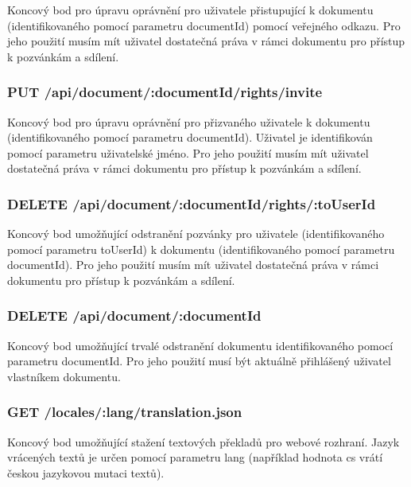 Koncový bod pro úpravu oprávnění pro uživatele přistupující k dokumentu (identifikovaného pomocí parametru documentId) pomocí veřejného odkazu.
Pro jeho použití musím mít uživatel dostatečná práva v rámci dokumentu pro přístup k pozvánkám a sdílení.

\subsubsection{PUT /api/document/:documentId/rights/invite}

Koncový bod pro úpravu oprávnění pro přizvaného uživatele k dokumentu (identifikovaného pomocí parametru documentId).
Uživatel je identifikován pomocí parametru uživatelské jméno.
Pro jeho použití musím mít uživatel dostatečná práva v rámci dokumentu pro přístup k pozvánkám a sdílení.

\subsubsection{DELETE /api/document/:documentId/rights/:toUserId}

Koncový bod umožňující odstranění pozvánky pro uživatele (identifikovaného pomocí parametru toUserId) k dokumentu (identifikovaného pomocí parametru documentId).
Pro jeho použití musím mít uživatel dostatečná práva v rámci dokumentu pro přístup k pozvánkám a sdílení.

\subsubsection{DELETE /api/document/:documentId}

Koncový bod umožňující trvalé odstranění dokumentu identifikovaného pomocí parametru documentId.
Pro jeho použití musí být aktuálně přihlášený uživatel vlastníkem dokumentu.

\subsubsection{GET /locales/:lang/translation.json}

Koncový bod umožňující stažení textových překladů pro webové rozhraní.
Jazyk vrácených textů je určen pomocí parametru lang (například hodnota cs vrátí českou jazykovou mutaci textů).
